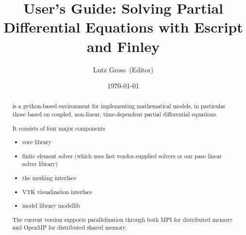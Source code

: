 \documentclass{manual}
\title{\esys User's Guide: Solving Partial Differential Equations with Escript and Finley}
\author{Lutz Gross\etal~(Editor)}
\date{\today}
\begin{document}
\maketitle



\begin{abstract}
\escript is a python-based environment for implementing mathematical models, in particular those based on coupled, non-linear, time-dependent partial differential equations.

It consists of four major components
\begin{itemize}
\item \escript core library
\item finite element solver \finley (which uses fast vendor-supplied solvers or our paso linear solver library)
\item the meshing interface \pycad
\item VTK visualization interface \pyvisi
\item model library modellib
\end{itemize}
The current version supports parallelization through both MPI for distributed memory and OpenMP for distributed shared memory. 
\end{abstract}

\tableofcontents















% 

%



\makemodindex

\printindex
%



\end{document}
